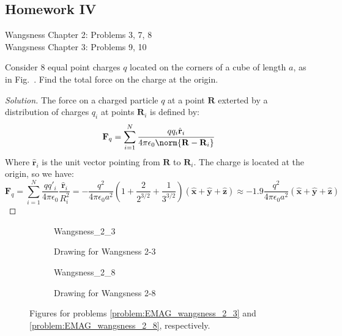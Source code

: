 \documentclass[crop=false,class=article,oneside]{standalone}
\begin{document}
    \subsection{Homework IV}
        Wangsness Chapter 2: Problems 3, 7, 8\\
        Wangsness Chapter 3: Problems 9, 10
        \begin{problem}[Wangsness 2-3]
            \label{problem:EMAG_wangsness_2_3}
            Consider $8$ equal point charges $q$ located on
            the corners of a cube of length $a$, as in
            Fig.~.
            Find the total force on the charge at the origin.
        \end{problem}
        \begin{proof}[Solution]
            The force on a charged particle $q$ at a point $\mathbf{R}$
            exterted by a distribution of charges $q_{i}$ at points
            $\mathbf{R}_{i}$ is defined by:
            \begin{equation*}
                \mathbf{F}_{q}
                =\sum_{i=1}^{N}
                \frac{qq_{i}\hat{\mathbf{r}}_{i}}
                     {4\pi\epsilon_{0}\norm{\mathbf{R}-\mathbf{R}_{i}}}
            \end{equation*}
            Where $\hat{\mathbf{r}}_{i}$ is the unit vector
            pointing from $\mathbf{R}$ to $\mathbf{R}_{i}$.
            The charge is located at the origin, so we have:
            \begin{equation*}
                \mathbf{F}_q=
                \sum_{i=1}^{N}\frac{qq'_{i}}{4\pi\epsilon_0}
                \frac{\hat{\mathbf{r}}_{i}}{R_{i}^{2}}
                =-\frac{q^{2}}{4\pi \epsilon_0 a^{2}}
                (1+\frac{2}{2^{3/2}}+\frac{1}{3^{3/2}})
                (\hat{\mathbf{x}}+\hat{\mathbf{y}}
                +\hat{\mathbf{z}})
                \approx-1.9\frac{q^{2}}{4\pi\epsilon_{0}a^{2}}
                (\hat{\mathbf{x}}
                +\hat{\mathbf{y}}
                +\hat{\mathbf{z}})
            \end{equation*}
        \end{proof}
        \begin{figure}[H]
            \centering
            \captionsetup{type=figure}
            \begin{subfigure}[b]{0.49\textwidth}
                \centering
                \captionsetup{type=figure}
                {Wangsness_2_3}
                \caption{Drawing for Wangsness 2-3}
                \label{fig:EMAG_1_Wangsness_2_3}
            \end{subfigure}
            \begin{subfigure}[b]{0.49\textwidth}
                \centering
                \captionsetup{type=figure}
                {Wangsness_2_8}
                \caption{Drawing for Wangsness 2-8}
                \label{fig:EMAG_1_wangsness_2_8}
            \end{subfigure}
            \caption[Figures for Wangsness 2-3 and 2-8]{%
                Figures for problems \ref{problem:EMAG_wangsness_2_3}
                and \ref{problem:EMAG_wangsness_2_8}, respectively.
            }
        \end{figure}
\end{document}
